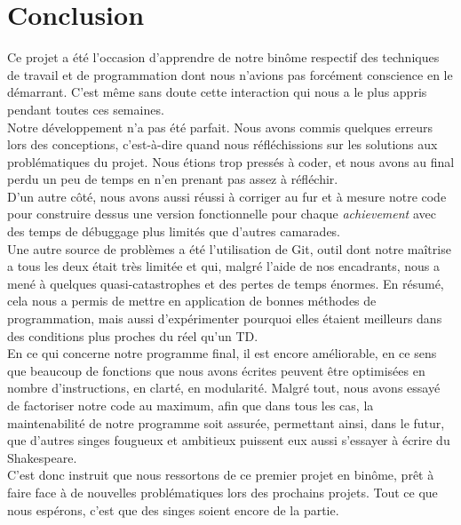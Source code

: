 \documentclass{article}
\begin{document}
\section{Conclusion}
Ce projet a été l'occasion d'apprendre de notre binôme respectif des techniques de travail et de programmation dont nous n'avions pas forcément conscience en le démarrant. C'est même sans doute cette interaction qui nous a le plus appris pendant toutes ces semaines.\\
Notre développement n'a pas été parfait.
Nous avons commis quelques erreurs lors des conceptions, c'est-à-dire quand nous réfléchissions sur les solutions aux problématiques du projet. Nous étions trop pressés à coder, et nous avons au final perdu un peu de temps en n'en prenant pas assez à réfléchir. \\
D'un autre côté, nous avons aussi réussi à corriger au fur et à mesure notre code pour construire dessus une version fonctionnelle pour chaque \emph{achievement} avec des temps de débuggage plus limités que d'autres camarades.\\
Une autre source de problèmes a été l'utilisation de Git, outil dont notre maîtrise a tous les deux était très limitée et qui, malgré l'aide de nos encadrants, nous a mené à quelques quasi-catastrophes et des pertes de temps énormes.
En résumé, cela nous a permis de mettre en application de bonnes méthodes de programmation, mais aussi d'expérimenter pourquoi elles étaient meilleurs dans des conditions plus proches du réel qu'un TD.\\

En ce qui concerne notre programme final, il est encore améliorable, en ce sens que beaucoup de fonctions que nous avons écrites peuvent être optimisées en nombre d'instructions, en clarté, en modularité. Malgré tout, nous avons essayé de factoriser notre code au maximum, afin que dans tous les cas, la maintenabilité de notre programme soit assurée, permettant ainsi, dans le futur, que d'autres singes fougueux et ambitieux puissent eux aussi s'essayer à écrire du Shakespeare.\\
 C'est donc instruit que nous ressortons de ce premier projet en binôme, prêt à faire face à de nouvelles problématiques lors des prochains projets. Tout ce que nous espérons, c'est que des singes soient encore de la partie.
\end{document}

